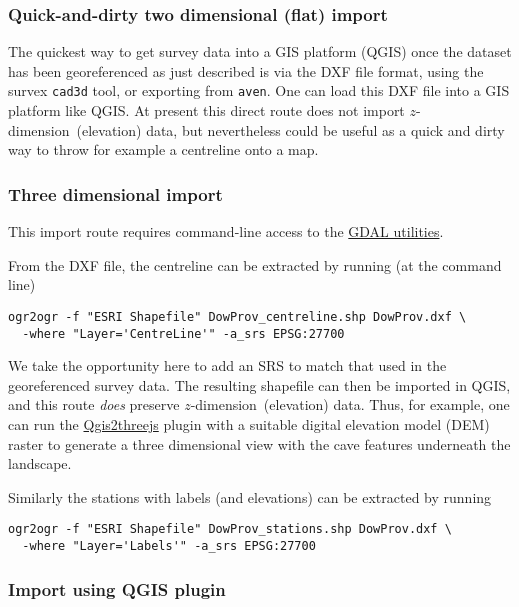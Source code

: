 \documentclass[]{article}
\newcommand{\zdimension}{$z$-dimension}
\begin{document}
\subsubsection{Quick-and-dirty two dimensional (flat)
import}\label{quick-and-dirty-two-dimensional-flat-import}

The quickest way to get survey data into a GIS platform (QGIS) once the
dataset has been georeferenced as just described is via the DXF file
format, using the survex \verb}cad3d} tool, or exporting from
\verb}aven}. One can load this DXF file into a GIS platform like QGIS.
At present this direct route does not import \zdimension\ (elevation)
data, but nevertheless could be useful as a quick and dirty way to throw
for example a centreline onto a map.

\subsubsection{Three dimensional import}\label{three-dimensional-import}

This import route requires command-line access to the
\href{http://www.gdal.org/ogr_utilities.html}{GDAL utilities}.

From the DXF file, the centreline can be extracted by running (at the
command line)

\begin{verbatim}
ogr2ogr -f "ESRI Shapefile" DowProv_centreline.shp DowProv.dxf \
  -where "Layer='CentreLine'" -a_srs EPSG:27700
\end{verbatim}

We take the opportunity here to add an SRS to match that used in the
georeferenced survey data. The resulting shapefile can then be imported
in QGIS, and this route \emph{does} preserve \zdimension\ (elevation)
data. Thus, for example, one can run the
\href{https://plugins.qgis.org/plugins/Qgis2threejs/}{Qgis2threejs}
plugin with a suitable digital elevation model (DEM) raster to generate
a three dimensional view with the cave features underneath the
landscape.

Similarly the stations with labels (and elevations) can be extracted by
running

\begin{verbatim}
ogr2ogr -f "ESRI Shapefile" DowProv_stations.shp DowProv.dxf \
  -where "Layer='Labels'" -a_srs EPSG:27700
\end{verbatim}

\subsubsection{Import using QGIS plugin}\label{import-using-qgis-plugin}
\end{document}
